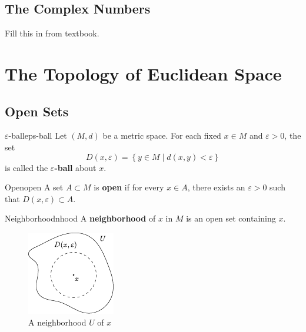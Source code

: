 \documentclass[10pt]{report}
\begin{document}

\section{The Complex Numbers}
{\color{red}Fill this in from textbook.} 



\chapter{The Topology of Euclidean Space}


\section{Open Sets}

\begin{defn}{$\varepsilon$-ball}{eps-ball}
	Let $(M,d)$ be a metric space. For each fixed $x\in M$ and $\varepsilon>0$, the set
	\[
		D(x,\varepsilon) = \left\{ y \in M \;|\; d(x,y) < \varepsilon \right\}
	\] 
is called the \textbf{$\varepsilon$-ball} about $x$.
\end{defn}

\begin{defn}{Open}{open}
	A set $A  \subset M$ is \textbf{open} if for every $x \in A$, there exists an $\varepsilon>0$ such that $D(x,\varepsilon) \subset A$.
\end{defn}

\begin{defn}{Neighborhood}{nhood}
	A \textbf{neighborhood} of $x$ in $M$ is an open set containing $x$.
\end{defn}

\begin{figure}[H]
	\centering
	\includegraphics[scale=2]{fig/neighborhood.pdf}
	\caption{A neighborhood $U$ of $x$}
\end{figure}
\end{document}
